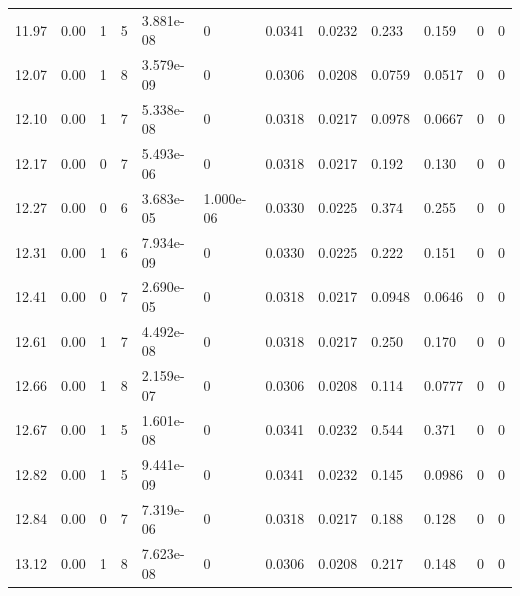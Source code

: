 \documentclass[preview]{standalone}
\begin{document}
{{{{\begin{tabular}{L{1.2cm}C{1.2cm} C{0.3cm}C{0.5cm} C{1.4cm}C{1.4cm} C{1.4cm}C{1.4cm} C{1.6cm}C{1.6cm} C{1.6cm}C{1.6cm}}
  11.97  &  0.00  & 1     &  5 &  3.881e-08  & 0  &  0.0341&   0.0232& 0.233 & 0.159   &  0 & 0  \\ 
  12.07  &  0.00  & 1     &  8 &  3.579e-09  & 0  &  0.0306&   0.0208& 0.0759 & 0.0517   &  0 & 0  \\ 
  12.10  &  0.00  & 1     &  7 &  5.338e-08  & 0  &  0.0318&   0.0217& 0.0978 & 0.0667   &  0 & 0  \\ 
  12.17  &  0.00  & 0     &  7 &  5.493e-06  & 0  &  0.0318&   0.0217& 0.192 & 0.130   &  0 & 0  \\ 
  12.27  &  0.00  & 0     &  6 &  3.683e-05  & 1.000e-06  &  0.0330&   0.0225& 0.374 & 0.255   &  0 & 0  \\ 
  12.31  &  0.00  & 1     &  6 &  7.934e-09  & 0  &  0.0330&   0.0225& 0.222 & 0.151   &  0 & 0  \\ 
  12.41  &  0.00  & 0     &  7 &  2.690e-05  & 0  &  0.0318&   0.0217& 0.0948 & 0.0646   &  0 & 0  \\ 
  12.61  &  0.00  & 1     &  7 &  4.492e-08  & 0  &  0.0318&   0.0217& 0.250 & 0.170   &  0 & 0  \\ 
  12.66  &  0.00  & 1     &  8 &  2.159e-07  & 0  &  0.0306&   0.0208& 0.114 & 0.0777   &  0 & 0  \\ 
  12.67  &  0.00  & 1     &  5 &  1.601e-08  & 0  &  0.0341&   0.0232& 0.544 & 0.371   &  0 & 0  \\ 
  12.82  &  0.00  & 1     &  5 &  9.441e-09  & 0  &  0.0341&   0.0232& 0.145 & 0.0986   &  0 & 0  \\ 
  12.84  &  0.00  & 0     &  7 &  7.319e-06  & 0  &  0.0318&   0.0217& 0.188 & 0.128   &  0 & 0  \\ 
  13.12  &  0.00  & 1     &  8 &  7.623e-08  & 0  &  0.0306&   0.0208& 0.217 & 0.148   &  0 & 0  \\ 
\hline 
\end{tabular} 

}}}}
\end{document}
